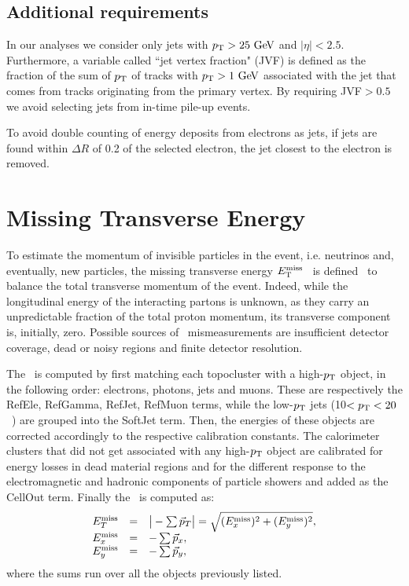 \myskip
\tocless\subsection{Additional requirements}
In our analyses we consider only jets with $\pt > 25\gev$ and $|\eta| < 2.5$.
Furthermore, a variable called ``jet vertex fraction" (JVF) is defined as the fraction
of the sum of $\pt$ of tracks with $\pt>1\gev$
associated with the jet that comes from tracks originating from the primary vertex.
By requiring JVF$>0.5$ we avoid selecting jets from in-time pile-up events.

To avoid double counting of energy deposits from electrons as jets,
if jets are found within $\Delta R$ of 0.2 of the selected electron, the
jet closest to the electron is removed. 


\section{Missing Transverse Energy}\label{sec:met}

To estimate the momentum of invisible particles in the event, i.e. neutrinos and, eventually, new particles,
the missing transverse energy $\met$~\cite{met} is defined~\cite{topcommon2013} to balance the total transverse momentum of the event.
Indeed, while the longitudinal energy of the interacting partons is unknown, as they carry an unpredictable
fraction of the total proton momentum, its transverse component is, initially, zero.
Possible sources of \met\ mismeasurements are
insufficient detector coverage, dead or noisy regions and
finite detector resolution.

The \met\ is computed by first matching each topocluster
with a high-$\pt$ object,  in the following order: electrons, photons, jets and muons.
These are respectively the RefEle, RefGamma, RefJet, RefMuon terms, while 
the low-$\pt$ jets (10$<\pt<20$~\gev)
are grouped into the SoftJet term. Then, the energies of these objects are
corrected accordingly to the respective calibration constants. 
The calorimeter clusters
that did not get associated with any  high-$\pt$ object are calibrated for energy losses in 
dead material regions and for the different response to the electromagnetic and hadronic
components of particle showers and added as the CellOut term. 
Finally the \met\ is computed as:
\begin{equation}\label{eq:met}
\begin{array}{lcl}
E^{\rm miss}_{T} & = & \big|-\sum\vec{p}_T \big| = \sqrt{(E^{\rm miss}_{x})^2 + (E^{\rm miss}_{y})^2} ,\\
E^{\rm miss}_{x} & = & -\sum\vec{p}_x ,\\
E^{\rm miss}_{y} & = & -\sum\vec{p}_y ,\\
\end{array}	\end{equation}
where the sums run over all the objects previously listed.

